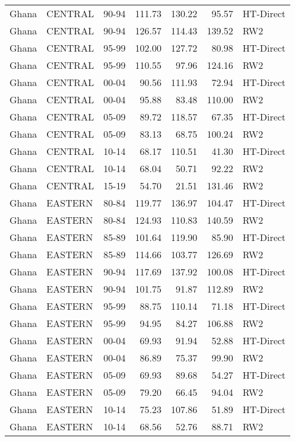 \begin{longtable}{lllrrrl}
  Ghana & CENTRAL & 90-94 & 111.73 & 130.22 & 95.57 & HT-Direct \\ 
  Ghana & CENTRAL & 90-94 & 126.57 & 114.43 & 139.52 & RW2 \\ 
  Ghana & CENTRAL & 95-99 & 102.00 & 127.72 & 80.98 & HT-Direct \\ 
  Ghana & CENTRAL & 95-99 & 110.55 & 97.96 & 124.16 & RW2 \\ 
  Ghana & CENTRAL & 00-04 & 90.56 & 111.93 & 72.94 & HT-Direct \\ 
  Ghana & CENTRAL & 00-04 & 95.88 & 83.48 & 110.00 & RW2 \\ 
  Ghana & CENTRAL & 05-09 & 89.72 & 118.57 & 67.35 & HT-Direct \\ 
  Ghana & CENTRAL & 05-09 & 83.13 & 68.75 & 100.24 & RW2 \\ 
  Ghana & CENTRAL & 10-14 & 68.17 & 110.51 & 41.30 & HT-Direct \\ 
  Ghana & CENTRAL & 10-14 & 68.04 & 50.71 & 92.22 & RW2 \\ 
  Ghana & CENTRAL & 15-19 & 54.70 & 21.51 & 131.46 & RW2 \\ 
  Ghana & EASTERN & 80-84 & 119.77 & 136.97 & 104.47 & HT-Direct \\ 
  Ghana & EASTERN & 80-84 & 124.93 & 110.83 & 140.59 & RW2 \\ 
  Ghana & EASTERN & 85-89 & 101.64 & 119.90 & 85.90 & HT-Direct \\ 
  Ghana & EASTERN & 85-89 & 114.66 & 103.77 & 126.69 & RW2 \\ 
  Ghana & EASTERN & 90-94 & 117.69 & 137.92 & 100.08 & HT-Direct \\ 
  Ghana & EASTERN & 90-94 & 101.75 & 91.87 & 112.89 & RW2 \\ 
  Ghana & EASTERN & 95-99 & 88.75 & 110.14 & 71.18 & HT-Direct \\ 
  Ghana & EASTERN & 95-99 & 94.95 & 84.27 & 106.88 & RW2 \\ 
  Ghana & EASTERN & 00-04 & 69.93 & 91.94 & 52.88 & HT-Direct \\ 
  Ghana & EASTERN & 00-04 & 86.89 & 75.37 & 99.90 & RW2 \\ 
  Ghana & EASTERN & 05-09 & 69.93 & 89.68 & 54.27 & HT-Direct \\ 
  Ghana & EASTERN & 05-09 & 79.20 & 66.45 & 94.04 & RW2 \\ 
  Ghana & EASTERN & 10-14 & 75.23 & 107.86 & 51.89 & HT-Direct \\ 
  Ghana & EASTERN & 10-14 & 68.56 & 52.76 & 88.71 & RW2 \\ 

\end{longtable}
